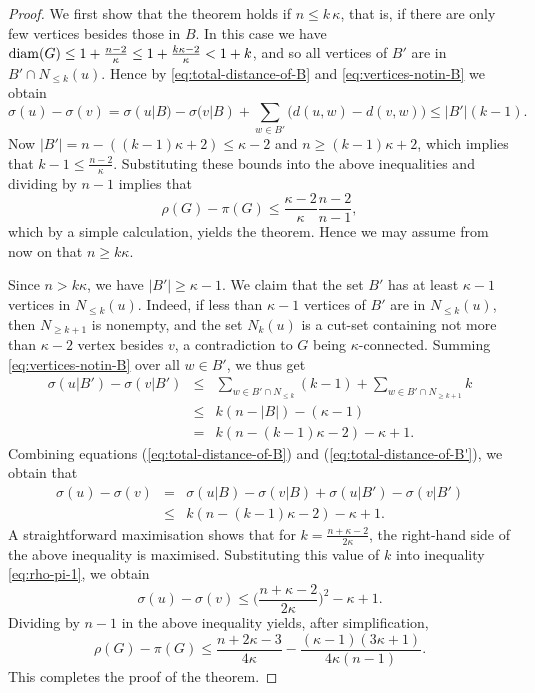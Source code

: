 \documentclass[a4paper,11pt]{article}
\begin{document}
\begin{proof}
We first show that the theorem holds if $n \leq k\, \kappa$, that is, if there are only few vertices
besides those in $B$. In this case we have  
${\rm diam}(G) \leq 1 + \frac{n-2}{\kappa} \leq 1 + \frac{k\kappa-2}{\kappa} < 1+k$,
and so all vertices of $B'$ are in $B' \cap N_{\leq k}(u)$. Hence by 
\eqref{eq:total-distance-of-B} and \eqref{eq:vertices-notin-B} we obtain
\[ \sigma(u) - \sigma(v) = \sigma(u|B) - \sigma(v|B) + \sum_{w \in B'} \big( d(u,w)-d(v,w)\big)  
           \leq |B'|(k-1). \]
Now $|B'|=n-((k-1)\kappa+2) \leq \kappa-2$ and $n \geq (k-1)\kappa+2$, which implies that
$k-1 \leq \frac{n-2}{\kappa}$. Substituting these bounds into the above inequalities and 
dividing by $n-1$ implies that
\[ \rho(G) - \pi(G) \leq \frac{\kappa-2}{\kappa} \frac{n-2}{n-1}, \]
which by a simple calculation,
yields the theorem. Hence we may assume from now on that $n \geq k \kappa$. 

Since $n > k \kappa$, we have $|B'| \geq \kappa-1$.
We claim that the set $B'$ has at least $\kappa-1$ vertices in $N_{\leq k}(u)$. 
Indeed, if less than $\kappa-1$ vertices of $B'$ are in $N_{\leq k}(u)$, then 
$N_{\geq k+1}$ is nonempty, and the set $N_k(u)$ is a cut-set containing not more than $\kappa-2$ 
vertex besides $v$, a contradiction to $G$ being $\kappa$-connected. 
Summing \eqref{eq:vertices-notin-B} over all \( w \in B' \), we thus get
\begin{eqnarray} 
\sigma(u|B') - \sigma(v|B')  
 & \leq & \sum_{w \in B' \cap N_{\leq k}} (k-1) + \sum_{w \in B' \cap N_{\geq k+1}} k \nonumber \\
 & \leq & k(n-|B|)-(\kappa-1) \nonumber \\ 
 & = & k(n - (k-1)\kappa-2)-\kappa+1. \label{eq:total-distance-of-B'}
\end{eqnarray}
Combining equations (\ref{eq:total-distance-of-B}) and (\ref{eq:total-distance-of-B'}), we obtain that
\begin{eqnarray}
\sigma(u) - \sigma(v) 
& = & \sigma(u|B) - \sigma(v|B) +\sigma(u|B') - \sigma(v|B') \nonumber  \\
& \leq &   k(n - (k-1)\kappa-2)-\kappa+1. \label{eq:rho-pi-1}
\end{eqnarray}
A straightforward maximisation shows that for \( k = \frac{n+\kappa-2}{2\kappa} \), the right-hand side of the above 
inequality is maximised. Substituting this value of \( k \) into inequality 
\eqref{eq:rho-pi-1}, we obtain
\[
\sigma(u) - \sigma(v) \leq \Big( \frac{n+\kappa-2}{2\kappa} \Big)^2 - \kappa + 1.
\]
Dividing by $n-1$ in the above inequality yields, after simplification,
\[
\rho(G) - \pi(G) \leq \frac{n+2\kappa-3}{4\kappa}   
                 - \frac{(\kappa-1)(3\kappa+1)}{4\kappa (n-1)}.
\]
This completes the proof of the theorem.
\end{proof}
\end{document}
